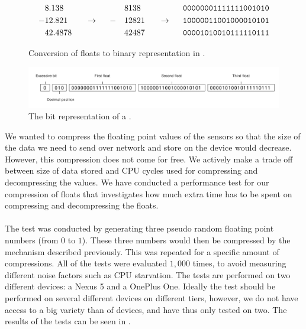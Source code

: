 \begin{figure}[!htbp]
    \begin{alignat*}{6}
       &8.138   &&                   &&   && 8138  &&                   && \text{\texttt{00000001111111001010}} \\
      -&12.821  && ~~ \rightarrow ~~ && - && 12821 && ~~ \rightarrow ~~ && \text{\texttt{10000011001000010101}} \\
       &42.4878 &&                   &&   && 42487 &&                   && \text{\texttt{00001010010111110111}} 
    \end{alignat*}
    \caption{Conversion of floats to binary representation in .}
    \label{fig:float_triple_convert}
\end{figure}
\FloatBarrier

\begin{figure}[!htbp]
    \centering
    \includegraphics[width=\textwidth]{graphic/gathering_sensor_data/float_triple_bit}
    \caption{The bit representation of a .}
    \label{fig:float_triple_bit}
\end{figure}
\FloatBarrier

We wanted to compress the floating point values of the sensors so that the size of the data we need to send over network and store on the device would decrease. However, this compression does not come for free. We actively make a trade off between size of data stored and CPU cycles used for compressing and decompressing the values. We have conducted a performance test for our compression of floats that investigates how much extra time has to be spent on compressing and decompressing the floats. 
\\\\
The test was conducted by generating three pseudo random floating point numbers (from $0$ to $1$). These three numbers would then be compressed by the mechanism described previously. This was repeated for a specific amount of compressions. All of the tests were evaluated $1,000$ times, to avoid measuring different noise factors such as CPU starvation. The tests are performed on two different devices: a Nexus 5 and a OnePlus One. Ideally the test should be performed on several different devices on different tiers, however, we do not have access to a big variety than of devices, and have thus only tested on two. The results of the tests can be seen in .

